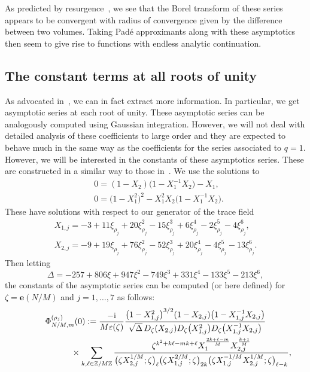 \documentclass[pdftex]{sigma}
\numberwithin{equation}{section}
\def\BZ{\mathbb{Z}}
\def\z{\zeta}
\def\be{\begin{equation}}
\def\ee{\end{equation}}
\def\e{\mathbf e}
\def\etaroots{\varepsilon}
\def\BZ{\mathbb Z}
\def\be{\begin{equation}}
\def\ee{\end{equation}}
\def\z{\zeta}
\begin{document}
As predicted by resurgence~\cite{Gar:resCS}, we see that the Borel transform of these series appears to be convergent with radius of convergence given by the difference between two volumes. Taking Pad\'e approximants along with these asymptotics then seem to give rise to functions with endless analytic continuation.

\subsection{The constant terms at all roots of unity}

As advocated in~\cite{DimGar:II,GZ:qser,GZ:RQMOD,Zagier:Qmod}, we can in fact extract more information. In particular, we get asymptotic series at each root of unity. These asymptotic series can be analogously computed using Gaussian integration.
However, we will not deal with detailed analysis of these coefficients to large order and they are expected to behave much in the same way as the coefficients for the series associated to $q=1$. However, we will be interested in the constants of these asymptotics series. These are constructed in a similar way to those in~\cite{GZ:RQMOD}. We use the solutions to
\begin{align}
 &0 =(1-X_2)\bigl(1-X_1^{-1}X_2\bigr)-X_1 ,\nonumber\\
 &0 =\bigl(1-X_1^2\bigr)^2-X_1^2X_2\bigl(1-X_1^{-1}X_2\bigr) .\label{eq:Xequs}
\end{align}
These have solutions with respect to our generator of the trace field
\begin{gather}
 X_{1,j} =-3+11\xi_{\rho_j}+20\xi_{\rho_j}^2-15\xi_{\rho_j}^3+6\xi_{\rho_j}^4-2\xi_{\rho_j}^5-4\xi_{\rho_j}^6 ,\nonumber\\
 X_{2,j} =-9+19\xi_{\rho_j}+76\xi_{\rho_j}^2-52\xi_{\rho_j}^3+20\xi_{\rho_j}^4-4\xi_{\rho_j}^5-13\xi_{\rho_j}^6 .\label{eq:Xsols}
\end{gather}
Then letting
\be\label{eq:Delta}
 \Delta
  =
 -257+806\xi+947\xi^2-749\xi^3+331\xi^4-133\xi^5-213\xi^6 ,
\ee
the constants of the asymptotic series can be computed (or here defined) for $\z=\e(N/M)$ and $j=1,\dots,7$ as follows:
\begin{gather}
 \Phi^{(\rho_j)}_{N/M,m}(0):=\frac{-{\rm i}}{M\etaroots(\z)}\frac{\bigl(1-X_{1,j}^2\bigr)^{3/2}(1-X_{2,j})\bigl(1-X_{1,j}^{-1}X_{2,j}\bigr)} {\sqrt{\Delta}\,D_{\z}(X_{2,j})D_{\z}\bigl(X_{1,j}^2\bigr)D_{\z}\bigl(X_{1,j}^{-1}X_{2,j}\bigr)}\nonumber\\
 \hphantom{\Phi^{(\rho_j)}_{N/M,m}(0):=}{}
 \times\sum_{k,\ell\in\BZ/M\BZ}
 \frac{\z^{k^2+k\ell-mk+\ell}X_{1}^{\frac{2k+\ell-m}{M}}X_{2,j}^{\frac{k+1}{M}}}{\bigl(\z X_{2,j}^{1/M};\z\bigr)_{\ell}\bigl(\z X_{1,j}^{2/M};\z\bigr)_{2k}\bigl(\z X_{1,j}^{-1/M}X_{2,j}^{1/M};\z\bigr)_{\ell-k}} ,\label{eq:phicont}
\end{gather}
\end{document}
